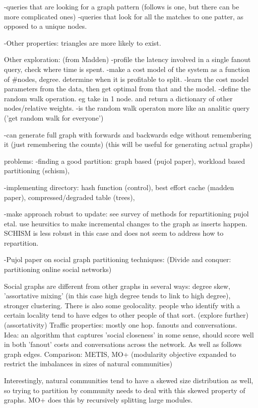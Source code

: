 \documentclass{article}
\begin{document}
-queries that are looking for a graph pattern (follows is one, but there can be more complicated ones)
-queries that look for all the matches to one patter, as opposed to  a unique nodes.

-Other properties: triangles are more likely to exist.

Other exploration: (from Madden)
-profile the latency involved in a single fanout query, check where time is spent.
-make a cost model of the system as a function of #nodes, degree. determine when it is profitable to split.
-learn the cost model parameters from the data, then get optimal from that and the model.
-define the random walk operation. eg take in 1 node. and return a dictionary of other nodes/relative weights.
-is the random walk operaton more like an analitic query ('get random walk for everyone')


-can generate full graph with forwards and backwards edge without remembering it (just remembering the counts)
 (this will be useful for generating actual graphs)

problems:
-finding a good partition:
graph based (pujol paper), workload based partitioning (schism), 

-implementing directory:
hash function (control), best effort cache (madden paper), compressed/degraded table (trees), 

-make approach robust to update:
see survey of methods for repartitioning
pujol etal. use heursitics to make incremental changes to the graph as inserts happen.
SCHISM is less robust in this case and does not seem to address how to repartition.

-Pujol paper on social graph partitioning techniques: (Divide and conquer: partitioning online social networks)

Social graphs are different from other graphs in several ways: degree skew, 'assortative mixing' (in this case high degree tends to link to high degree), 
stronger clustering.
There is also some geolocality. people who identify with a certain locality tend to have edges to other people of that sort. (explore further) (assortativity)
Traffic properties: mostly one hop. fanouts and conversations. 
Idea: an algorithm that captures 'social closeness' in some sense, should score well in both 'fanout' costs and
conversations across the network. As well as follows graph edges.
Comparison: METIS, MO+ (modularity objective expanded to restrict the imbalances in sizes of natural communities)

Interestingly, natural communities tend to have a skewed size distribution as well, so trying to partition by community needs to deal 
with this skewed property of graphs.  MO+ does this by recursively splitting large modules. 
\end{document}
